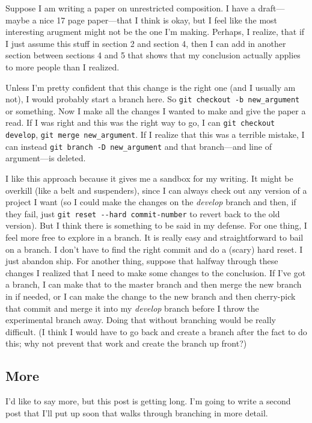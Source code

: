 \documentclass{article}
\begin{document}
Suppose I am writing a paper on unrestricted composition. I have a
draft—maybe a nice 17 page paper—that I think is okay, but I feel
like the most interesting arugment might not be the one I'm making.
Perhaps, I realize, that if I just assume this stuff in section 2
and section 4, then I can add in another section between sections 4
and 5 that shows that my conclusion actually applies to more people
than I realized.

Unless I'm pretty confident that this change is the right one (and
I usually am not), I would probably start a branch here. So
\verb!git checkout -b new_argument! or something. Now I make all
the changes I wanted to make and give the paper a read. If I was
right and this was the right way to go, I can
\verb!git checkout develop!, \verb!git merge new_argument!. If I
realize that this was a terrible mistake, I can instead
\verb!git branch -D new_argument! and that branch—and line of
argument—is deleted.

I like this approach because it gives me a sandbox for my writing.
It might be overkill (like a belt and suspenders), since I can
always check out any version of a project I want (so I could make
the changes on the \emph{develop} branch and then, if they fail,
just \verb!git reset --hard commit-number! to revert back to the
old version). But I think there is something to be said in my
defense. For one thing, I feel more free to explore in a branch. It
is really easy and straightforward to bail on a branch. I don't
have to find the right commit and do a (scary) hard reset. I just
abandon ship. For another thing, suppose that halfway through these
changes I realized that I need to make some changes to the
conclusion. If I've got a branch, I can make that to the master
branch and then merge the new branch in if needed, or I can make
the change to the new branch and then cherry-pick that commit and
merge it into my \emph{develop} branch before I throw the
experimental branch away. Doing that without branching would be
really difficult. (I think I would have to go back and create a
branch after the fact to do this; why not prevent that work and
create the branch up front?)

\subsection{More}

I'd like to say more, but this post is getting long. I'm going to
write a second post that I'll put up soon that walks through
branching in more detail.
\end{document}
